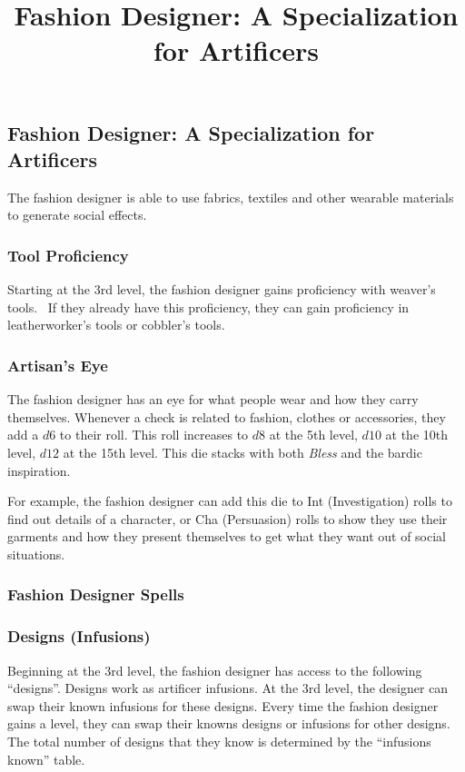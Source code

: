 \documentclass[twocolumn]{dndbook}
\begin{document}
\title{Fashion Designer: A Specialization for Artificers}

\subsection{Fashion Designer: A Specialization for Artificers}

The fashion designer is able to use fabrics, textiles and other wearable materials to generate social effects.

\subsubsection{Tool Proficiency}

Starting at the 3rd level, the fashion designer gains proficiency with weaver's tools.\
If they already have this proficiency, they can gain proficiency in leatherworker's tools or cobbler's tools.

\subsubsection{Artisan's Eye}
The fashion designer has an eye for what people wear and how they carry themselves.
Whenever a check is related to fashion, clothes or accessories, they add a $d6$ to their roll.
This roll increases to $d8$ at the 5th level, $d10$ at the 10th level, $d12$ at the 15th level.
This die stacks with both \emph{Bless} and the bardic inspiration.\par

For example, the fashion designer can add this die to Int (Investigation) rolls to find out details of a character,
or Cha (Persuasion) rolls to show they use their garments and how they present themselves to get what they want out of social situations.\par

\subsubsection{Fashion Designer Spells}


\subsubsection{Designs (Infusions)}

Beginning at the 3rd level, the fashion designer has access to the following ``designs''.
Designs work as artificer infusions.
At the 3rd level, the designer can swap their known infusions for these designs.
Every time the fashion designer gains a level, they can swap their knowns designs or infusions for other designs.
The total number of designs that they know is determined by the ``infusions known'' table.\par
\end{document}
